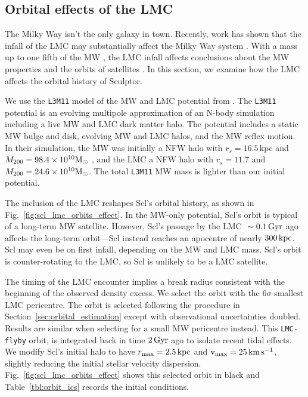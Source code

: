 \subsection{Orbital effects of the LMC}\label{sec:scl_lmc}

The Milky Way isn't the only galaxy in town. Recently, work has shown
that the infall of the LMC may substantially affect the Milky Way system
\citep[e.g.,][]{erkal+2019, cautun+2019, garavito-camargo+2021, vasiliev2023}.
With a mass up to one fifth of the MW \citep[e.g.,][]{penarrubia+2015},
the LMC infall affects conclusions about the MW properties and the
orbits of satellites \citep[see
e.g.,][]{patel+2020, battaglia+2022, correamagnus+vasiliev2022}. In this
section, we examine how the LMC affects the orbital history of Sculptor.

We use the \texttt{L3M11} model of the MW and LMC potential from
\citet{vasiliev2024}. The \texttt{L3M11} potential is an evolving
multipole approximation of an N-body simulation including a live MW and
LMC dark matter halo. The potential includes a static MW bulge and disk,
evolving MW and LMC halos, and the MW reflex motion. In their
simulation, the MW was initially a NFW halo with \(r_s=16.5\,\)kpc and
\(M_{\rm 200}= 98.4\times10^{10}{\rm M}_{\odot}\) , and the LMC a NFW halo with
\(r_s=11.7\) and \(M_{200} = 24.6 \times 10^{10} {\rm M}_{\odot}\). The total
\texttt{L3M11} MW mass is lighter than our initial \citet{EP2020}
potential.

The inclusion of the LMC reshapes Scl's orbital history, as shown in
Fig.~\ref{fig:scl_lmc_orbits_effect}. In the MW-only potential, Scl's
orbit is typical of a long-term MW satellite. However, Scl's passage by
the LMC \(~\sim0.1\,{\rm Gyr}\) ago affects the long-term orbit---Scl instead
reaches an apocentre of nearly \(300\,{\rm kpc}\). Scl may even be on first
infall, depending on the MW and LMC mass. Scl's orbit is
counter-rotating to the LMC, so Scl is unlikely to be a LMC satellite.

The timing of the LMC encounter implies a break radius consistent with
the beginning of the observed density excess. We select the orbit with
the \(6\sigma\)-smallest LMC pericentre. The orbit is selected following
the procedure in Section~\ref{sec:orbital_estimation} except with
observational uncertainties doubled. Results are similar when selecting
for a small MW pericentre instead. This \texttt{LMC-flyby} orbit, is
integrated back in time \(2\,{\rm Gyr}\) ago to isolate recent tidal effects.
We modify Scl's initial halo to have \(r_{\rm max} = 2.5\,{\rm kpc}\) and
\({\rm v}_{\rm max} = 25\,{\rm km\,s^{-1}}\), slightly reducing the initial stellar velocity
dispersion. Fig.~\ref{fig:scl_lmc_orbits_effect} shows this selected
orbit in black and Table~\ref{tbl:orbit_ics} records the initial
conditions.


